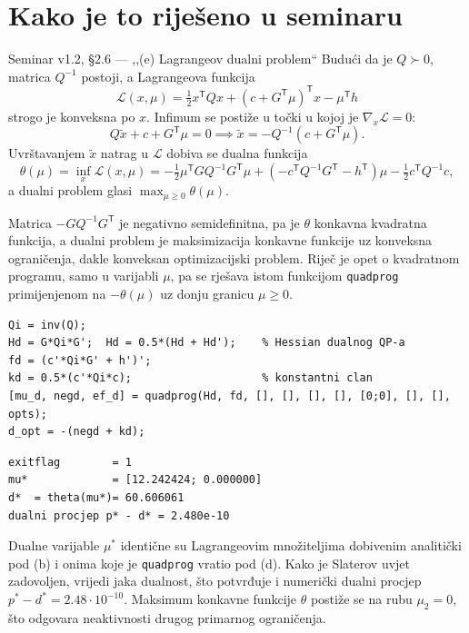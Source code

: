 \section{Kako je to riješeno u seminaru}
\label{sec:z1e-seminar}

\begin{seminar}{Seminar v1.2, §2.6 --- ,,(e) Lagrangeov dualni problem``}
Budući da je $Q \succ 0$, matrica $Q^{-1}$ postoji, a Lagrangeova funkcija
\[
\mathcal{L}(x, \mu) = \tfrac{1}{2} x^{\mathsf{T}} Q x + (c + G^{\mathsf{T}}\mu)^{\mathsf{T}} x - \mu^{\mathsf{T}} h
\]
strogo je konveksna po $x$. Infimum se postiže u točki u kojoj je
$\nabla_x \mathcal{L} = 0$:
\[
Q\tilde{x} + c + G^{\mathsf{T}} \mu = 0 \implies \tilde{x} = -Q^{-1}(c + G^{\mathsf{T}} \mu).
\]
Uvrštavanjem $\tilde{x}$ natrag u $\mathcal{L}$ dobiva se dualna funkcija
\[
\theta(\mu) = \inf_{x} \mathcal{L}(x, \mu)
= -\tfrac{1}{2} \mu^{\mathsf{T}} G Q^{-1} G^{\mathsf{T}} \mu
+ \left( -c^{\mathsf{T}} Q^{-1} G^{\mathsf{T}} - h^{\mathsf{T}} \right) \mu
- \tfrac{1}{2} c^{\mathsf{T}} Q^{-1} c,
\]
a dualni problem glasi $\max_{\mu \geq 0} \theta(\mu)$.

Matrica $-G Q^{-1} G^{\mathsf{T}}$ je negativno semidefinitna, pa je $\theta$
konkavna kvadratna funkcija, a dualni problem je maksimizacija konkavne funkcije
uz konveksna ograničenja, dakle konveksan optimizacijski problem. Riječ je opet o
kvadratnom programu, samo u varijabli $\mu$, pa se rješava istom funkcijom
\texttt{quadprog} primijenjenom na $-\theta(\mu)$ uz donju granicu $\mu \geq 0$.

\begin{lstlisting}[style=matlabstyle]
Qi = inv(Q);
Hd = G*Qi*G';  Hd = 0.5*(Hd + Hd');    % Hessian dualnog QP-a
fd = (c'*Qi*G' + h')';
kd = 0.5*(c'*Qi*c);                    % konstantni clan
[mu_d, negd, ef_d] = quadprog(Hd, fd, [], [], [], [], [0;0], [], [], opts);
d_opt = -(negd + kd);
\end{lstlisting}

\begin{lstlisting}[style=outputstyle]
exitflag        = 1
mu*             = [12.242424; 0.000000]
d*  = theta(mu*)= 60.606061
dualni procjep p* - d* = 2.480e-10
\end{lstlisting}

Dualne varijable $\mu^*$ identične su Lagrangeovim množiteljima dobivenim
analitički pod (b) i onima koje je \texttt{quadprog} vratio pod (d). Kako je
Slaterov uvjet zadovoljen, vrijedi jaka dualnost, što potvrđuje i numerički
dualni procjep $p^* - d^* = 2.48 \cdot 10^{-10}$. Maksimum konkavne funkcije
$\theta$ postiže se na rubu $\mu_2 = 0$, što odgovara neaktivnosti drugog
primarnog ograničenja.
\end{seminar}

